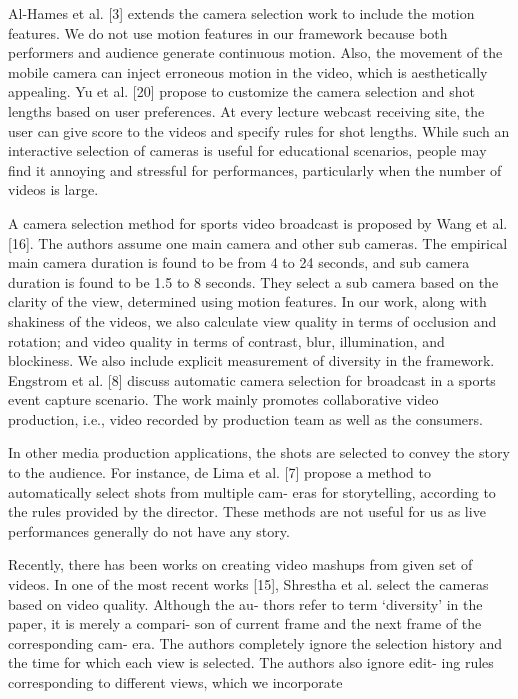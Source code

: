 \documentclass{sig-alternate-05-2015}
\begin{document}
Al-Hames et al. [3] extends the camera selection work to include
the motion features. We do not use motion features in our framework
because both performers and audience generate continuous
motion. Also, the movement of the mobile camera can inject erroneous
motion in the video, which is aesthetically appealing. Yu et
al. [20] propose to customize the camera selection and shot lengths
based on user preferences. At every lecture webcast receiving site,
the user can give score to the videos and specify rules for shot
lengths. While such an interactive selection of cameras is useful
for educational scenarios, people may find it annoying and stressful
for performances, particularly when the number of videos is
large.\par
A camera selection method for sports video broadcast is proposed
by Wang et al. [16]. The authors assume one main camera
and other sub cameras. The empirical main camera duration is
found to be from 4 to 24 seconds, and sub camera duration is found
to be 1.5 to 8 seconds. They select a sub camera based on the clarity
of the view, determined using motion features. In our work,
along with shakiness of the videos, we also calculate view quality
in terms of occlusion and rotation; and video quality in terms
of contrast, blur, illumination, and blockiness. We also include
explicit measurement of diversity in the framework. Engstrom et
al. [8] discuss automatic camera selection for broadcast in a sports
event capture scenario. The work mainly promotes collaborative
video production, i.e., video recorded by production team as well
as the consumers.\par
In other media production applications, the shots are selected to
convey the story to the audience. For instance, de Lima et al. [7]
propose a method to automatically select shots from multiple cam-
eras for storytelling, according to the rules provided by the director.
These methods are not useful for us as live performances generally
do not have any story.\par
Recently, there has been works on creating video mashups from
given set of videos. In one of the most recent works [15], Shrestha
et al. select the cameras based on video quality. Although the au-
thors refer to term ‘diversity’ in the paper, it is merely a compari-
son of current frame and the next frame of the corresponding cam-
era. The authors completely ignore the selection history and the
time for which each view is selected. The authors also ignore edit-
ing rules corresponding to different views, which we incorporate
\end{document}
